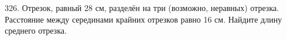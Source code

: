 326. Отрезок, равный 28 см, разделён на три (возможно, неравных) отрезка. Расстояние между серединами крайних отрезков равно 16 см. Найдите длину среднего отрезка.\\

